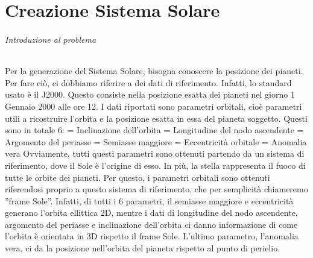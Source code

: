 \documentclass[a4paper]{article}
\begin{document}
\part{Creazione Sistema Solare}
\pagestyle{plain}

\paragraph{Introduzione al problema\newline}
Per la generazione del Sistema Solare, bisogna conoscere la posizione dei pianeti. Per fare ciò, ci dobbiamo riferire a dei dati di riferimento. Infatti, lo standard usato è il J2000. Questo consiste nella posizione esatta dei pianeti nel giorno 1 Gennaio 2000 alle ore 12.
I dati riportati sono parametri orbitali, cioè parametri utili a ricostruire l'orbita e la posizione esatta in essa del pianeta soggetto. 
Questi sono in totale 6: \newline
[\textit{i}] = Inclinazione dell'orbita \newline [$\Omega$] =  Longitudine del nodo ascendente \newline [$\omega$] = Argomento del periasse \newline
[\textit{a}] = Semiasse maggiore \newline [\textit{e}] = Eccentricità orbitale \newline [$\theta$] = Anomalia vera \newline \newline
Ovviamente, tutti questi parametri sono ottenuti partendo da un sistema di riferimento, dove il Sole è l'origine di esso. In più, la stella rappresenta il fuoco di tutte le orbite dei pianeti. Per questo, i parametri orbitali sono ottenuti riferendosi proprio a questo sistema di riferimento, che per semplicità chiameremo ''frame Sole''.
Infatti, di tutti i 6 parametri, il semiasse maggiore e eccentricità generano l'orbita ellittica 2D, mentre i dati di longitudine del nodo ascendente, argomento del periasse e inclinazione dell'orbita ci danno informazione di come l'orbita è orientata in 3D rispetto il frame Sole.
L'ultimo parametro, l'anomalia vera, ci da la posizione nell'orbita del pianeta rispetto al punto di perielio.
\end{document}
